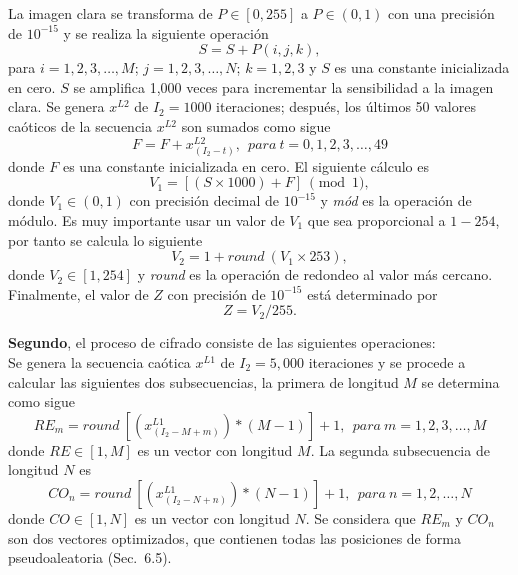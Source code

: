 La imagen clara se transforma de $P\in[0,255]$ a $P\in(0,1)$ con una precisión de $10^{-15}$ y se realiza la siguiente operación
\begin{equation}
S=S+P(i,j,k),
\end{equation}
para $i=1,2,3,\ldots,M$; $j=1,2,3,\ldots ,N$; $k=1,2,3$ y $S$ es una constante inicializada en cero. $S$ se amplifica 1,000 veces para incrementar la sensibilidad a la imagen clara. Se genera $x^{L2}$ de $I_{2}=1000$ iteraciones; después, los últimos 50 valores caóticos de la secuencia $x^{L2}$ son sumados como sigue  
\begin{equation}
F=F+x_{(I_{2}-t)}^{L2}, ~~ para ~t=0,1,2,3,\ldots,49
\end{equation}
donde  $F$ es una constante inicializada en cero. El siguiente cálculo es
\begin{equation}
V_{1}=[(S\times 1000)+F]~\pmod 1,
\end{equation}
donde $V_{1}\in(0,1)$ con precisión decimal de $10^{-15}$ y \textit{mód} es la operación de módulo. Es muy importante usar un valor de $V_{1}$ que sea proporcional a $1-254$, por tanto se calcula lo siguiente
\begin{equation}
V_{2}=1+round~(V_{1}\times 253),
\end{equation}
donde $V_{2}\in[1,254]$ y \textit{round} es la operación de redondeo al valor más cercano. Finalmente, el valor de $Z$ con precisión de $10^{-15}$ está determinado por
\begin{equation}
Z=V_{2}/255.
\end{equation}

\textbf{Segundo}, el proceso de cifrado consiste de las siguientes operaciones: \\

Se genera la secuencia caótica $x^{L1}$ de $I_{2}=5,000$ iteraciones y se procede a calcular las siguientes dos subsecuencias, la primera de longitud $M$ se determina como sigue
\begin{equation}
RE_{m}=round~\left[(x_{(I_{2}-M+m)}^{L1})\ast (M-1)\right]+1, ~~ para ~m=1,2,3,\ldots,M
\end{equation}
donde $RE\in[1,M]$ es un vector con longitud $M$. La segunda subsecuencia de longitud $N$ es  
\begin{equation}
CO_{n}=round~\left[(x_{(I_{2}-N+n)}^{L1})\ast (N-1)\right]+1, ~~para ~n=1,2,\ldots,N
\end{equation}
donde $CO\in[1,N]$ es un vector con longitud $N$. Se considera que $RE_{m}$ y $CO_{n}$ son dos vectores optimizados, que contienen todas las posiciones de forma pseudoaleatoria (Sec.~6.5).  \\

